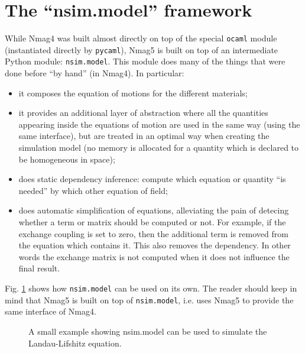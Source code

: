 \documentclass[11pt,oneside,openany]{article}
\begin{document}
\section{The ``nsim.model'' framework} \label{sec:nmag5_framework}
While Nmag4 was built almost directly on top of the special \verb|ocaml| module
(instantiated directly by \verb|pycaml|), Nmag5 is built on top of an
intermediate Python module: \verb|nsim.model|. This module does many of the
things that were done before ``by hand'' (in Nmag4). In particular:
\begin{itemize}
\item it composes the equation of motions for the different materials;
\item it provides an additional layer of abstraction where all the quantities
  appearing inside the equations of motion are used in the same way
  (using the same interface), but are treated in an optimal way when creating
  the simulation model (no memory is allocated for a quantity which is
  declared to be homogeneous in space);
\item does static dependency inference: compute which equation or quantity
  ``is needed'' by which other equation of field;
\item does automatic simplification of equations, alleviating the pain
  of detecing whether a term or matrix should be computed or not.
  For example, if the exchange coupling is set to zero, then the additional
  term is removed from the equation which contains it. This also removes
  the dependency. In other words the exchange matrix is not computed
  when it does not influence the final result.
\end{itemize}

Fig. \ref{fig:nsimmodel} shows how \verb|nsim.model| can be used on its own.
The reader should keep in mind that Nmag5 is built on top of \verb|nsim.model|,
i.e. uses Nmag5 to provide the same interface of Nmag4.
\begin{figure}[!p]

\caption{A small example showing nsim.model can be used to simulate
  the Landau-Lifshitz equation.}
\label{fig:nsimmodel}
\end{figure}
\end{document}
